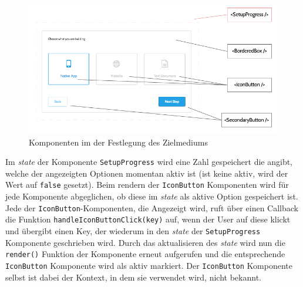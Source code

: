 \begin{figure}[h]
    \centering
    \includegraphics[width=1\textwidth]{images/components.png}
    \caption{Komponenten im der Festlegung des Zielmediums}
    \label{fig:components}
\end{figure}


Im \textit{state} der Komponente \verb|SetupProgress| wird eine Zahl gespeichert die angibt, welche der angezeigten Optionen momentan aktiv ist (ist keine aktiv, wird der Wert auf \verb|false| gesetzt). Beim rendern der \verb|IconButton| Komponenten wird für jede Komponente abgeglichen, ob diese im \textit{state} als aktive Option gespeichert ist. Jede der \verb|IconButton|-Komponenten, die Angezeigt wird, ruft über einen Callback die Funktion \verb|handleIconButtonClick(key)| auf, wenn der User auf diese klickt und übergibt einen Key, der wiederum in den \textit{state} der  \verb|SetupProgress| Komponente geschrieben wird. Durch das aktualisieren des \textit{state} wird nun die \verb|render()| Funktion der Komponente erneut aufgerufen und die entsprechende \verb|IconButton| Komponente wird als aktiv markiert.
Der  \verb|IconButton| Komponente selbst ist dabei der Kontext, in dem sie verwendet wird, nicht bekannt.


